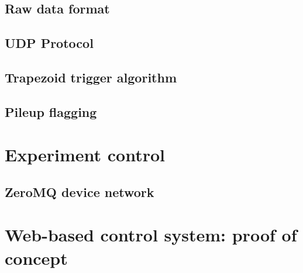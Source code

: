 \subsection{Raw data format}



\subsection{UDP Protocol}



\subsection{Trapezoid trigger algorithm}



\subsection{Pileup flagging}



\section{Experiment control}



\subsection{ZeroMQ device network}



\section{Web-based control system: proof of concept}

